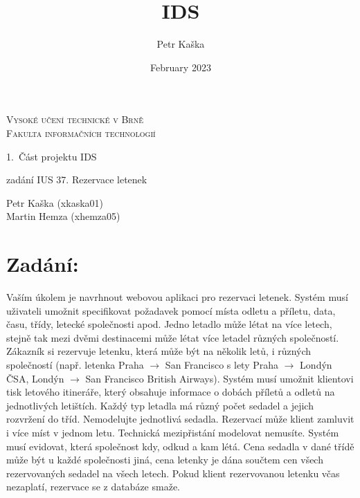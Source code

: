 \documentclass[a4paper, 11pt]{article}
\title{IDS}
\author{Petr Kaška}
\date{February 2023}
\begin{document}
 
    \begin{titlepage}
        
        \begin{center}
        
            {\Huge\textsc{ Vysoké učení technické v Brně\\
            \huge Fakulta informačních technologií}\\}
            
             
             {\LARGE \Huge{1.~Část projektu IDS\\ }}
             
                \vspace{0.5cm}
                
             {\LARGE zadání IUS 37. Rezervace letenek}
            
           \end{center} 
            
            {\LARGE 
            {Petr Kaška (xkaska01)\\
            Martin Hemza (xhemza05)}}
            
    \end{titlepage}
    \section{Zadání:}
    \Large{Vaším úkolem je navrhnout webovou aplikaci pro rezervaci letenek. Systém musí uživateli umožnit specifikovat požadavek pomocí místa odletu a příletu, data, času, třídy, letecké společnosti apod. Jedno letadlo může létat na více letech, stejně tak mezi dvěmi destinacemi může létat více letadel různých společností. Zákazník si rezervuje letenku, která může být na několik letů, i různých společností (např. letenka Praha  $\rightarrow$ San Francisco s lety Praha $\rightarrow$ Londýn ČSA, Londýn  $\rightarrow$ San Francisco British Airways). Systém musí umožnit klientovi tisk letového itineráře, který obsahuje informace o dobách příletů a odletů na jednotlivých letištích. Každý typ letadla má různý počet sedadel a jejich rozvržení do tříd. Nemodelujte jednotlivá sedadla. Rezervací může klient zamluvit i více míst v jednom letu. Technická mezipřistání modelovat nemusíte. Systém musí evidovat, která společnost kdy, odkud a kam létá. Cena sedadla v dané třídě může být u každé společnosti jiná, cena letenky je dána součtem cen všech rezervovaných sedadel na všech letech. Pokud klient rezervovanou letenku včas nezaplatí, rezervace se z databáze smaže.}
\end{document}
